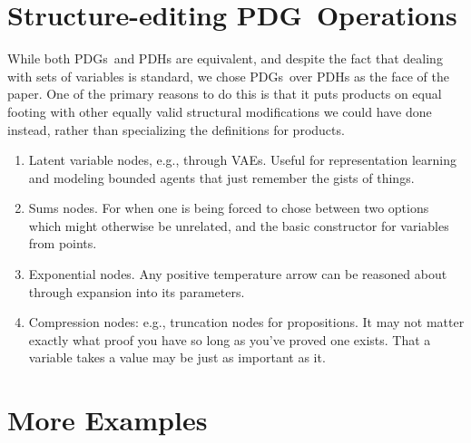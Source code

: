 \documentclass{article}
\newcommand{\MN}{PDG}
\newcommand{\MNH}{PDH}
\newcommand{\MNs}{\MN s}
\numberwithin{equation}{section}
\begin{document}
\begin{notfocus}
	
	
	\section{Structure-editing \MN\ Operations}
	
	While both \MNs\ and \MNH s are equivalent, and despite the fact that dealing with sets of variables is standard, we chose \MNs\ over \MNH s as the face of the paper. One of the primary reasons to do this is that it puts products on equal footing with other equally valid structural modifications we could have done instead, rather than specializing the definitions for products.
	
	\begin{enumerate}
		\item Latent variable nodes, e.g., through VAEs. Useful for representation learning and modeling bounded agents that just remember the gists of things.
		
		\item Sums nodes. For when one is being forced to chose between two options which might otherwise be unrelated, and the basic constructor for variables from points.
		
		\item Exponential nodes. Any positive temperature arrow can be reasoned about through expansion into its parameters.
		
		\item Compression nodes: e.g., truncation nodes for propositions. It may not matter exactly what proof you have so long as you've proved one exists. That a variable takes a value may be just as important as it.
	\end{enumerate}
	
	
	\section{More Examples}\label{sec:more-examples}
	
	\begin{example}
		\label{ex:corrob}
	\end{example}

	
	\begin{vcat}

\end{vcat}
\end{notfocus}
\end{document}
